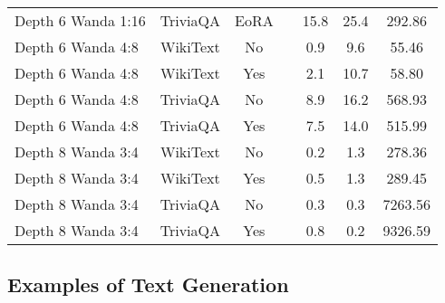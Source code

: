 \begin{longtable}{lcclccc}
Depth 6 Wanda 1:16 & TriviaQA & EoRA & & 15.8 & 25.4 & 292.86 \\
Depth 6 Wanda 4:8 & WikiText & No & & 0.9 & 9.6 & 55.46 \\
Depth 6 Wanda 4:8 & WikiText & Yes & & 2.1 & 10.7 & 58.80 \\
Depth 6 Wanda 4:8 & TriviaQA & No & & 8.9 & 16.2 & 568.93 \\
Depth 6 Wanda 4:8 & TriviaQA & Yes & & 7.5 & 14.0 & 515.99 \\
Depth 8 Wanda 3:4 & WikiText & No & & 0.2 & 1.3 & 278.36 \\
Depth 8 Wanda 3:4 & WikiText & Yes & & 0.5 & 1.3 & 289.45 \\
Depth 8 Wanda 3:4 & TriviaQA & No & & 0.3 & 0.3 & 7263.56 \\
Depth 8 Wanda 3:4 & TriviaQA & Yes & & 0.8 & 0.2 & 9326.59 \\

\end{longtable}
\normalsize

\subsection{Examples of Text Generation}